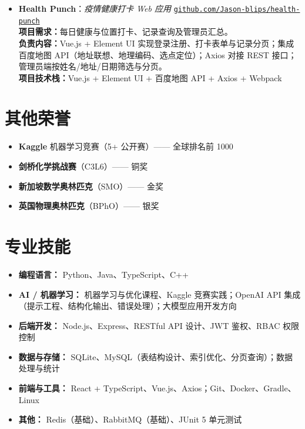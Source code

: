 \documentclass[a4paper]{article}
\begin{document}
\begin{itemize}[leftmargin=0pt, itemsep=8pt, label={}]
\item
  \textbf{Health Punch}：\textit{疫情健康打卡 Web 应用}
  \hfill \href{https://github.com/Jason-blips/health-punch}{\texttt{github.com/Jason-blips/health-punch}}\\[2pt]
  \textbf{项目需求：}每日健康与位置打卡、记录查询及管理员汇总。\\
  \textbf{负责内容：}Vue.js + Element UI 实现登录注册、打卡表单与记录分页；集成百度地图 API（地址联想、地理编码、选点定位）；Axios 对接 REST 接口；管理员端按姓名/地址/日期筛选与分页。\\
  \textbf{项目技术栈：}Vue.js \;+\; Element UI \;+\; 百度地图 API \;+\; Axios \;+\; Webpack
\end{itemize}
\vspace{0.2cm}

\section{其他荣誉}
\begin{itemize}
  \item \textbf{Kaggle} 机器学习竞赛（5+ 公开赛）—— 全球排名前 1000
  \item \textbf{剑桥化学挑战赛}（C3L6）—— 铜奖
  \item \textbf{新加坡数学奥林匹克}（SMO）—— 金奖
  \item \textbf{英国物理奥林匹克}（BPhO）—— 银奖
\end{itemize}
\vspace{0.2cm}

\section{专业技能}
\begin{itemize}
    \item \textbf{编程语言：} Python、Java、TypeScript、C++

    \item \textbf{AI / 机器学习：} 机器学习与优化课程、Kaggle 竞赛实践；OpenAI API 集成（提示工程、结构化输出、错误处理）；大模型应用开发方向

    \item \textbf{后端开发：} Node.js、Express、RESTful API 设计、JWT 鉴权、RBAC 权限控制

    \item \textbf{数据与存储：} SQLite、MySQL（表结构设计、索引优化、分页查询）；数据处理与统计

    \item \textbf{前端与工具：} React + TypeScript、Vue.js、Axios；Git、Docker、Gradle、Linux

    \item \textbf{其他：} Redis（基础）、RabbitMQ（基础）、JUnit 5 单元测试
\end{itemize}
\end{document}

